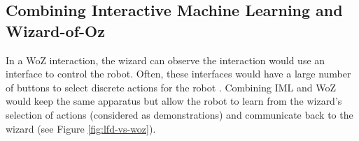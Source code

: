 \documentclass[manuscript, review, anonymous]{acmart}
\newcommand{\ES}[1]{\added[id=ES]{#1}}
\newcommand{\SL}[1]{\added[id=SL]{#1}}
\newcommand{\woz}{WoZ++\xspace}
\begin{document}
\subsection{Combining Interactive Machine Learning and Wizard-of-Oz} \label{sec:requirements}







In a WoZ interaction, the wizard can observe the interaction would use an interface to control the
robot. Often, these interfaces would have a large number of buttons to select
discrete actions for the robot%
. Combining IML and WoZ would keep the same apparatus but allow the robot to
learn from the wizard's selection of actions (considered as demonstrations) and
communicate back to the wizard (see Figure \ref{fig:lfd-vs-woz}).
\end{document}
